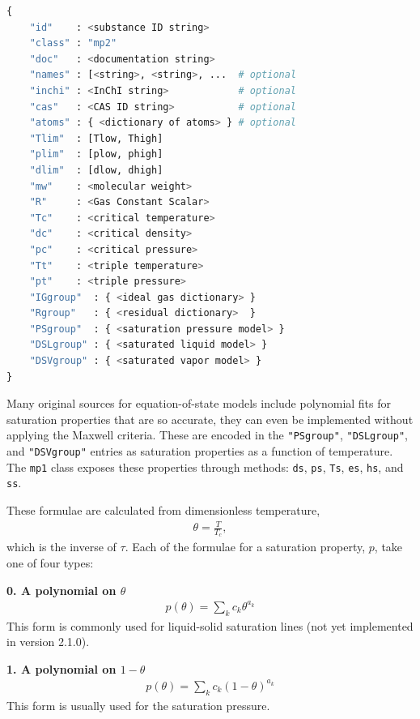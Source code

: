\begin{lstlisting}[language=Python]
{
    "id"    : <substance ID string>
    "class" : "mp2"
    "doc"   : <documentation string>
    "names" : [<string>, <string>, ...  # optional
    "inchi" : <InChI string>            # optional
    "cas"   : <CAS ID string>           # optional
    "atoms" : { <dictionary of atoms> } # optional
    "Tlim"  : [Tlow, Thigh]
    "plim"  : [plow, phigh]
    "dlim"  : [dlow, dhigh]
    "mw"    : <molecular weight>
    "R"     : <Gas Constant Scalar>
    "Tc"    : <critical temperature>
    "dc"    : <critical density>
    "pc"    : <critical pressure>
    "Tt"    : <triple temperature>
    "pt"    : <triple pressure>
    "IGgroup"  : { <ideal gas dictionary> }
    "Rgroup"   : { <residual dictionary>  }
    "PSgroup"  : { <saturation pressure model> }
    "DSLgroup" : { <saturated liquid model> }
    "DSVgroup" : { <saturated vapor model> }
}
\end{lstlisting}

Many original sources for equation-of-state models include polynomial fits for saturation properties that are so accurate, they can even be implemented without applying the Maxwell criteria.  These are encoded in the \texttt{"PSgroup"}, \texttt{"DSLgroup"}, and \texttt{"DSVgroup"} entries as saturation properties as a function of temperature.  The \texttt{mp1} class exposes these properties through methods: \texttt{ds}, \texttt{ps}, \texttt{Ts}, \texttt{es}, \texttt{hs}, and \texttt{ss}.  

These formulae are calculated from dimensionless temperature, 
\begin{align}
\theta = \frac{T}{T_c},
\end{align}
which is the inverse of $\tau$.  Each of the formulae for a saturation property, $p$, take one of four types:

{\bf 0. A polynomial on $\theta$} 
\begin{align}
p(\theta) = \sum_k c_k \theta^{a_k}
\end{align}
This form is commonly used for liquid-solid saturation lines (not yet implemented in version 2.1.0).

{\bf 1. A polynomial on $1-\theta$}
\begin{align}
p(\theta) = \sum_k c_k (1-\theta)^{a_k}
\end{align}
This form is usually used for the saturation pressure.

